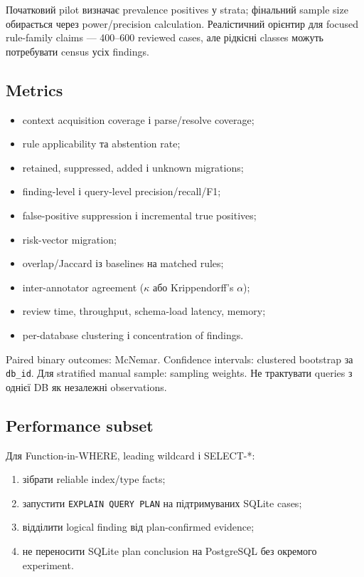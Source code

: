\documentclass[11pt,a4paper]{article}
\begin{document}
Початковий pilot визначає prevalence positives у strata; фінальний sample size
обирається через power/precision calculation. Реалістичний орієнтир для focused
rule-family claims --- 400--600 reviewed cases, але рідкісні classes можуть
потребувати census усіх findings.

\subsection{Metrics}

\begin{itemize}
\item context acquisition coverage і parse/resolve coverage;
\item rule applicability та abstention rate;
\item retained, suppressed, added і unknown migrations;
\item finding-level і query-level precision/recall/F1;
\item false-positive suppression і incremental true positives;
\item risk-vector migration;
\item overlap/Jaccard із baselines на matched rules;
\item inter-annotator agreement ($\kappa$ або Krippendorff's $\alpha$);
\item review time, throughput, schema-load latency, memory;
\item per-database clustering і concentration of findings.
\end{itemize}

Paired binary outcomes: McNemar. Confidence intervals: clustered bootstrap за
\texttt{db\_id}. Для stratified manual sample: sampling weights. Не трактувати
queries з однієї DB як незалежні observations.

\subsection{Performance subset}

Для Function-in-WHERE, leading wildcard і SELECT-*:

\begin{enumerate}
\item зібрати reliable index/type facts;
\item запустити \texttt{EXPLAIN QUERY PLAN} на підтримуваних SQLite cases;
\item відділити logical finding від plan-confirmed evidence;
\item не переносити SQLite plan conclusion на PostgreSQL без окремого experiment.
\end{enumerate}
\end{document}
